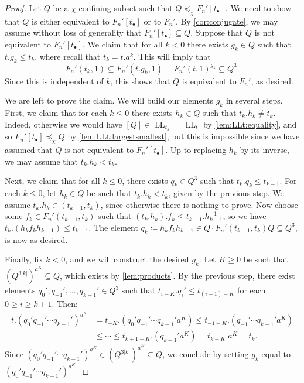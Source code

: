 \documentclass[reqno,12pt]{amsart}\setcounter{tocdepth}{1}
\theoremstyle{definition}
\DeclareMathOperator{\LL}{LL}
\numberwithin{equation}{section}
\begin{document}
\begin{proof}
Let $Q$ be a $\chi$-confining subset such that $Q\preceq_\chi F_n'[t_\bullet]$. We need to show that $Q$ is either equivalent to $F_n'[t_\bullet]$ or to $F_n'$. By \cref{cor:conjugate}, we may assume without loss of generality that $F_n'[t_\bullet] \subseteq Q$. Suppose that $Q$ is not equivalent to $F_n'[t_\bullet]$. We claim that for all $k < 0$ there exists $g_k \in Q$ such that $t.g_k \leq t_k$, where recall that $t_k=t.a^k$. This will imply that
\[
F_n'(t_k, 1) \subseteq F_n'(t.g_k, 1) = F_n'(t, 1)^{g_k} \subseteq Q^3.
\]
Since this is independent of $k$, this shows that $Q$ is equivalent to $F_n'$, as desired.

We are left to prove the claim. We will build our elements $g_k$ in several steps. First, we claim that for each $k \leq 0$ there exists $h_k \in Q$ such that $t_k.h_k \neq t_k$. Indeed, otherwise we would have $[Q] \in \LL_{t_k} = \LL_t$ by \cref{lem:LLt:equality}, and so $F_n'[t_\bullet] \preceq_\chi Q$ by \cref{lem:LLt:largestsmallest}, but this is impossible since we have assumed that $Q$ is not equivalent to $F_n'[t_\bullet]$. Up to replacing $h_k$ by its inverse, we may assume that $t_k.h_k < t_k$. 

Next, we claim that for all $k \leq 0$, there exists $q_k \in Q^3$ such that $t_k.q_k \leq t_{k-1}$. For each $k\le 0$, let $h_k \in Q$ be such that $t_k.h_k < t_k$, given by the previous step. We assume $t_k.h_k \in (t_{k-1}, t_k)$, since otherwise there is nothing to prove. Now choose some $f_k \in F_n'(t_{k-1}, t_k)$ such that $(t_k.h_k).f_k\le t_{k-1}.h_{k-1}^{-1}$, so we have $t_k.(h_k f_k h_{k-1}) \leq t_{k-1}$. The element $q_k \coloneqq h_k f_k h_{k-1} \in Q \cdot F_n'(t_{k-1}, t_k) Q \subseteq Q^3$, is now as desired. 

Finally, fix $k < 0$, and we will construct the desired $g_k$. Let $K \geq 0$ be such that $(Q^{3|k|})^{a^K} \subseteq Q$, which exists by \cref{lem:products}. By the previous step, there exist elements $q_0', q_{-1}', \ldots, q_{k+1}' \in Q^3$ such that $t_{i-K}.q_i' \leq t_{(i-1)-K}$ for each $0\ge i \ge k+1$. Then:
\begin{align*}
t. (q_0' q_{-1}' \cdots q_{k-1}')^{a^K} &= t_{-K}. (q_0' q_{-1}' \cdots q_{k-1}' a^K) \le t_{-1-K}. (q_{-1}' \cdots q_{k-1}' a^K) \\
&\le \cdots \le t_{k+1 - K}.(q_{k-1}' a^K) = t_{k-K}.a^K = t_{k}.
\end{align*}
Since $(q_0' q_{-1}' \cdots q_{k-1}')^{a^K} \in (Q^{3|k|})^{a^K} \subseteq Q$, we conclude by setting $g_k$ equal to $(q_0' q_{-1}' \cdots q_{k-1}')^{a^K}$.
\end{proof}
\end{document}
